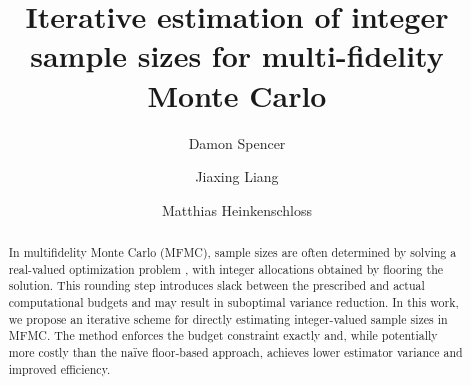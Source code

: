 \documentclass[final,3p,times,11pt]{elsarticle}
\begin{document}
\begin{frontmatter}
\title{Iterative estimation of integer sample sizes for multi-fidelity Monte Carlo}


\author[RiceCMOR]{Damon Spencer}
\address[RiceCMOR]{Department of Computational Applied Mathematics \& Operations Research, Rice University.}
\author[RiceCMOR]{Jiaxing Liang}
\address[RiceCMOR]{Department of Computational Applied Mathematics \& Operations Research, Rice University.}
\author[RiceCMOR]{Matthias Heinkenschloss}
\address[RiceCMOR]{Department of Computational Applied Mathematics \& Operations Research and The Ken Kennedy Institute, Rice  University.}
\begin{abstract}
In multifidelity Monte Carlo (MFMC), sample sizes are often determined by solving a real-valued optimization problem \cite{PeGuWi:2018}, with integer allocations obtained by flooring the solution. This rounding step introduces slack between the prescribed and actual computational budgets and may result in suboptimal variance reduction. In this work, we propose an iterative scheme for directly estimating integer-valued sample sizes in MFMC. The method enforces the budget constraint exactly and, while potentially more costly than the naïve floor-based approach, achieves lower estimator variance and improved efficiency.
\end{abstract}


%
\end{frontmatter}

 
 


 
 
 



% 

% 
\end{document}

